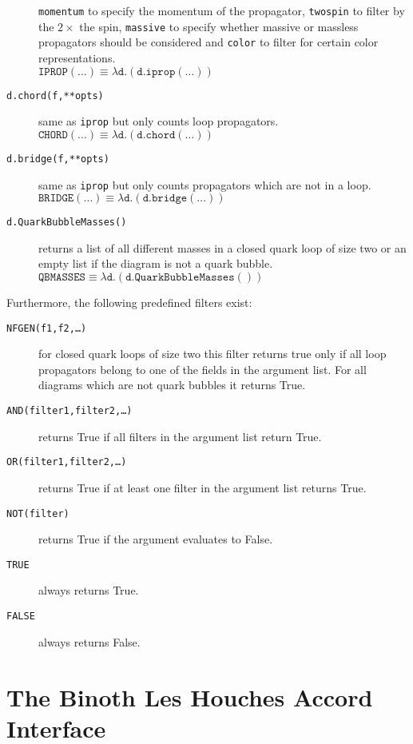 \documentclass[11pt,a4paper]{refrep}
\begin{document}
\begin{description}
   \texttt{momentum} to specify the momentum of the propagator,
   \texttt{twospin} to filter by the $2\times$ the spin,
   \texttt{massive} to specify whether massive or massless propagators
   should be considered and \texttt{color} to filter for certain color
   representations.\\
   $\mathtt{IPROP(\ldots)}\equiv%
    \lambda\mathtt{d}.(\mathtt{d.iprop(\ldots)})$
\item[\texttt{d.chord(f,**opts)}] same as \texttt{iprop}
   but only counts loop propagators.\\
   $\mathtt{CHORD(\ldots)}\equiv%
    \lambda\mathtt{d}.(\mathtt{d.chord(\ldots)})$
\item[\texttt{d.bridge(f,**opts)}] same as \texttt{iprop}
   but only counts propagators which are not in a loop.\\
   $\mathtt{BRIDGE(\ldots)}\equiv%
    \lambda\mathtt{d}.(\mathtt{d.bridge(\ldots)})$
\item[\texttt{d.QuarkBubbleMasses()}] returns a list of
   all different masses in a closed quark loop of size two
   or an empty list if the diagram is not a quark bubble.\\
   $\mathtt{QBMASSES}\equiv%
    \lambda\mathtt{d}.(\mathtt{d.QuarkBubbleMasses()})$
\end{description}

Furthermore, the following predefined filters exist:
\begin{description}
\item[\texttt{NFGEN(f1,f2,\ldots)}] for closed quark loops of size two
   this filter returns true only if all loop propagators belong to one
   of the fields in the argument list. For all diagrams which are not
   quark bubbles it returns True.
\item[\texttt{AND(filter1,filter2,\ldots)}] returns True if all filters
   in the argument list return True.
\item[\texttt{OR(filter1,filter2,\ldots)}] returns True if at least one filter
   in the argument list returns True.
\item[\texttt{NOT(filter)}] returns True if the argument evaluates to False.
\item[\texttt{TRUE}] always returns True.
\item[\texttt{FALSE}] always returns False.
\end{description}

\chapter{The Binoth Les Houches Accord Interface}
\end{document}
